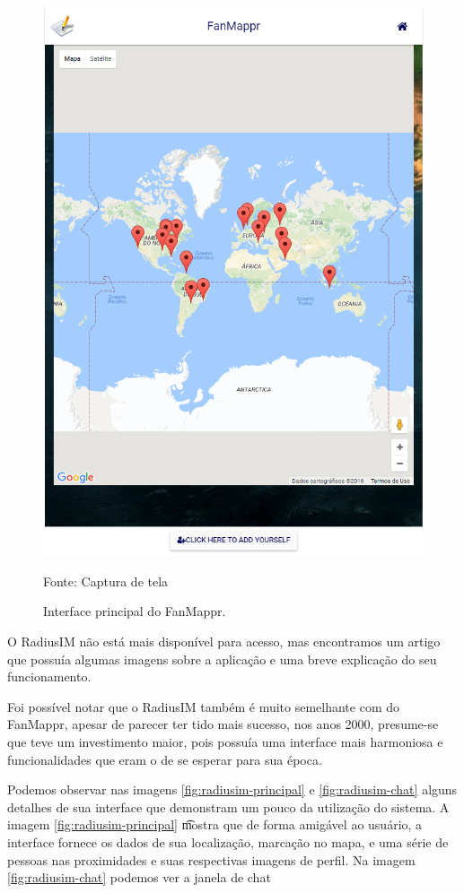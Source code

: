 \begin{figure}[H]
	\centering
	\includegraphics[scale=0.33]{imagens/fanmappr.png}
	\caption{\small Interface principal do FanMappr.} Fonte: Captura de tela
	\label{fig:fanmappr-principal}
\end{figure}

O RadiusIM não está mais disponível para acesso, mas encontramos um artigo \cite{radiusim} que possuía algumas imagens sobre a aplicação e uma breve explicação do seu funcionamento.

Foi possível notar que o RadiusIM também é muito semelhante com do FanMappr, apesar de parecer ter tido mais sucesso, nos anos 2000, presume-se que teve um investimento maior, pois possuía uma interface mais harmoniosa e funcionalidades que eram o de se esperar para sua época.

Podemos observar nas imagens \ref{fig:radiusim-principal} e \ref{fig:radiusim-chat} alguns detalhes de sua interface que demonstram um pouco da utilização do sistema. A imagem \ref{fig:radiusim-principal} \t mostra que de forma amigável ao usuário, a interface fornece os dados de sua localização, marcação no mapa, e uma série de pessoas nas proximidades e suas respectivas imagens de perfil. Na imagem \ref{fig:radiusim-chat} podemos ver a janela de chat 

